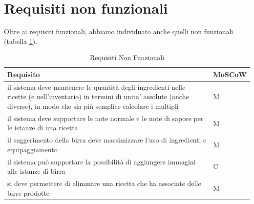\documentclass[a4paper,12pt]{report}
\begin{document}
	\section{Requisiti non funzionali}
	Oltre ai requisiti funzionali, abbiamo individuato anche quelli non funzionali (tabella \ref{tab:Requisiti-Non-Funzionali}). 
    		\begin{table}[!h]
      			\renewcommand{\arraystretch}{1.2}
      			\begin{tabular}{p{}|p{}} 
        				\textbf{Requisito}  & \textbf{MoSCoW} \\
    				\hline
                                  il sistema deve mantenere le quantità degli ingredienti nelle ricette (e nell'inventario) in termini di unita' assolute (anche diverse), in modo che sia più semplice calcolare i multipli & M \\
                                  il sistema deve supportare le note normale e le note di sapore per le istanze di una ricetta  & M \\
                                  il suggerimento della birra deve massimizzare l'uso di ingredienti e equipaggiamento & M \\
                                  il sistema può supportare la possibilità di aggiungere immagini alle istanze di birra & C \\
                                  si deve permettere di eliminare una ricetta che ha associate delle birre prodotte & M \\
        			\end{tabular}
        			\caption{Requisiti Non Funzionali}
      			\label{tab:Requisiti-Non-Funzionali}
    		\end{table}	
	
	
    \newpage
\end{document}
